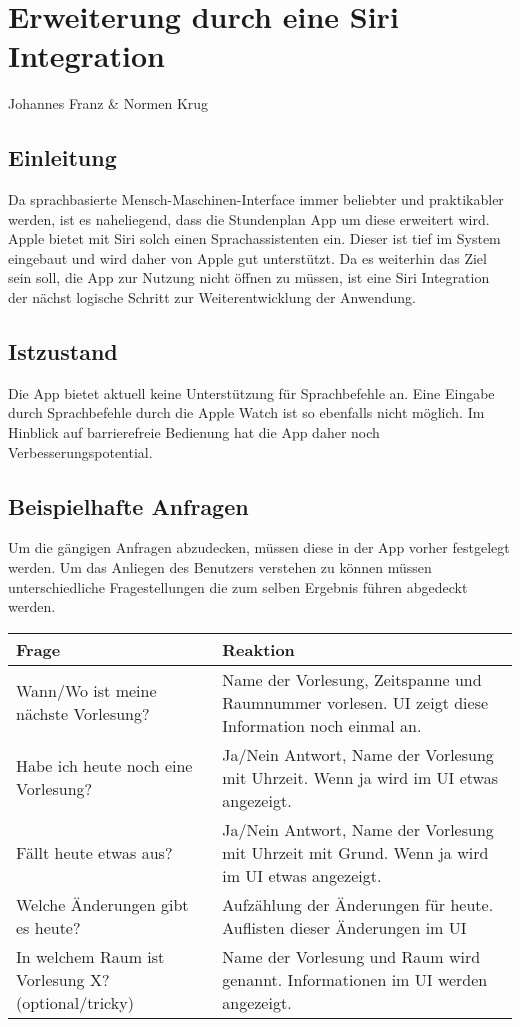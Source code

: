 \chapter{Erweiterung durch eine Siri Integration}
Johannes Franz \& Normen Krug

\section{Einleitung}
Da sprachbasierte Mensch-Maschinen-Interface immer beliebter und praktikabler werden, ist es naheliegend, dass die Stundenplan App um diese erweitert wird. Apple bietet mit Siri solch einen Sprachassistenten ein. Dieser ist tief im System eingebaut und wird daher von Apple gut unterstützt. 
Da es weiterhin das Ziel sein soll, die App zur Nutzung nicht öffnen zu müssen, ist eine Siri Integration der nächst logische Schritt zur Weiterentwicklung der Anwendung.


\section{Istzustand}
Die App bietet aktuell keine Unterstützung für Sprachbefehle an. Eine Eingabe durch Sprachbefehle durch die Apple Watch ist so ebenfalls nicht möglich. Im Hinblick auf barrierefreie Bedienung hat die App daher noch Verbesserungspotential.

\section{Beispielhafte Anfragen}
Um die gängigen Anfragen abzudecken, müssen diese in der App vorher festgelegt werden. Um das Anliegen des Benutzers verstehen zu können müssen unterschiedliche Fragestellungen die zum selben Ergebnis führen abgedeckt werden.


\noindent%
\begin{tabularx}{\textwidth}{|p{}|X| }
\hline
\textbf{Frage} & \textbf{Reaktion}  \\ \hline 

Wann/Wo ist meine nächste Vorlesung? & Name der Vorlesung, Zeitspanne und Raumnummer vorlesen.
UI zeigt diese Information noch einmal an.\\ \hline

Habe ich heute noch eine Vorlesung? & Ja/Nein Antwort, Name der Vorlesung mit Uhrzeit. 
Wenn ja wird im UI etwas angezeigt.
\\ \hline

Fällt heute etwas aus? & Ja/Nein Antwort, Name der Vorlesung mit Uhrzeit mit Grund. 
Wenn ja wird im UI etwas angezeigt.\\ \hline
Welche Änderungen gibt es heute? & Aufzählung der Änderungen für heute.
Auflisten dieser Änderungen im UI\\ \hline
In welchem Raum ist Vorlesung X? (optional/tricky) & Name der Vorlesung und Raum wird genannt.
Informationen im UI werden angezeigt.
\\ \hline

\end{tabularx}


